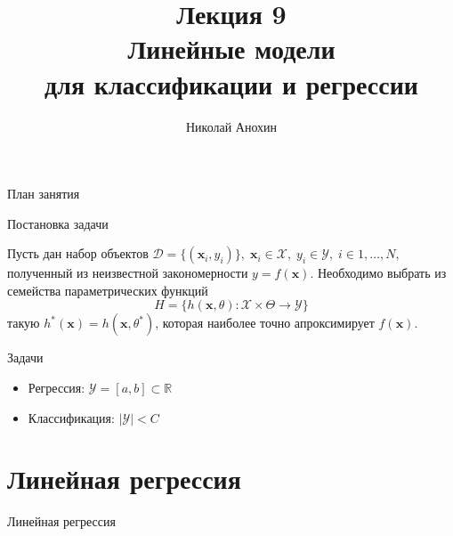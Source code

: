 \documentclass[10pt]{beamer}
\author{Николай Анохин}
\title{\newline \newline \newline Лекция 9 \\ Линейные модели \\ для классификации и регрессии}
\let\otp\titlepage
\renewcommand{\titlepage}{\otp\addtocounter{framenumber}{-1}}
\begin{document}
\begin{frame}[plain]
\titlepage
\end{frame}

\begin{frame}{План занятия}
\tableofcontents
\end{frame}

\begin{frame}{Постановка задачи}

Пусть дан набор объектов $\mathcal{D} = \{(\mathbf{x}_i, y_i)\},
\; \mathbf{x}_i \in \mathcal{X},
\; y_i \in \mathcal{Y},
\; i \in 1, \ldots, N$, полученный из неизвестной закономерности $y = f(\mathbf{x})$. Необходимо выбрать из семейства параметрических функций
\[
H = \{h(\mathbf{x}, \theta): \mathcal{X} \times \Theta \rightarrow \mathcal{Y} \}
\]
такую $h^*(\mathbf{x}) = h(\mathbf{x}, \theta^*)$, которая наиболее точно апроксимирует $f(\mathbf{x})$.

\vspace{1em}
Задачи
\begin{itemize}
\item Регрессия: $\mathcal{Y} = [a, b] \subset \mathbb{R}$
\item Классификация: $|\mathcal{Y}| < C$
\end{itemize}

\end{frame}


\section{Линейная регрессия}


\begin{frame}{}

\begin{center}
\Large Линейная регрессия
\end{center}

\end{frame}
\end{document}
